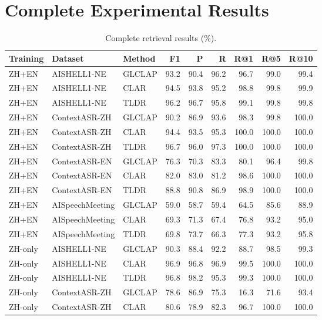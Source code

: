 \section{Complete Experimental Results}
\begin{table}[t]
\centering
\caption{Complete retrieval results (\%).}
\label{tab:supp_retrieval}
\small
\setlength{\tabcolsep}{3.5pt}
\begin{tabular}{lllrrrrrr}
\toprule
Training & Dataset & Method & F1 & P & R & R@1 & R@5 & R@10 \\
\midrule
ZH+EN & AISHELL1-NE & GLCLAP & 93.2 & 90.4 & 96.2 & 96.7 & 99.0 & 99.4 \\
ZH+EN & AISHELL1-NE & CLAR & 94.5 & 93.8 & 95.2 & 98.8 & 99.8 & 99.9 \\
ZH+EN & AISHELL1-NE & TLDR & 96.2 & 96.7 & 95.8 & 99.1 & 99.8 & 99.8 \\
ZH+EN & ContextASR-ZH & GLCLAP & 90.2 & 86.9 & 93.6 & 98.3 & 99.8 & 100.0 \\
ZH+EN & ContextASR-ZH & CLAR & 94.4 & 93.5 & 95.3 & 100.0 & 100.0 & 100.0 \\
ZH+EN & ContextASR-ZH & TLDR & 96.7 & 96.0 & 97.3 & 100.0 & 100.0 & 100.0 \\
ZH+EN & ContextASR-EN & GLCLAP & 76.3 & 70.3 & 83.3 & 80.1 & 96.4 & 99.8 \\
ZH+EN & ContextASR-EN & CLAR & 82.0 & 83.0 & 81.2 & 98.6 & 100.0 & 100.0 \\
ZH+EN & ContextASR-EN & TLDR & 88.8 & 90.8 & 86.9 & 98.9 & 100.0 & 100.0 \\
ZH+EN & AISpeechMeeting & GLCLAP & 59.0 & 58.7 & 59.4 & 64.5 & 85.6 & 88.9 \\
ZH+EN & AISpeechMeeting & CLAR & 69.3 & 71.3 & 67.4 & 76.8 & 93.2 & 95.0 \\
ZH+EN & AISpeechMeeting & TLDR & 69.8 & 73.7 & 66.3 & 77.3 & 93.2 & 95.8 \\
\midrule
ZH-only & AISHELL1-NE & GLCLAP & 90.3 & 88.4 & 92.2 & 88.7 & 98.5 & 99.3 \\
ZH-only & AISHELL1-NE & CLAR & 96.9 & 96.8 & 96.9 & 99.5 & 100.0 & 100.0 \\
ZH-only & AISHELL1-NE & TLDR & 96.8 & 98.2 & 95.3 & 99.3 & 100.0 & 100.0 \\
ZH-only & ContextASR-ZH & GLCLAP & 78.6 & 86.9 & 75.3 & 16.3 & 71.6 & 93.4 \\
ZH-only & ContextASR-ZH & CLAR & 80.6 & 78.9 & 82.3 & 96.7 & 100.0 & 100.0 \\

\end{tabular}
\end{table}
